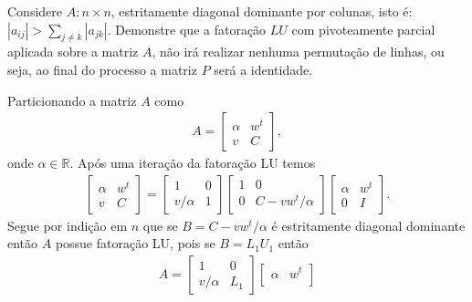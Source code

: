 \begin{questions}
     Considere $A : n \times n$, estritamente diagonal dominante por colunas, isto \'{e}: $| a_{ij} | > \sum_{j \neq k} | a_{jk} |$. Demonstre que a fatora\c{c}\~{a}o $LU$ com pivoteamente parcial aplicada sobre a matriz $A$, n\~{a}o ir\'{a} realizar nenhuma permuta\c{c}\~{a}o de linhas, ou seja, ao final do processo a matriz $P$ ser\'{a} a identidade.
    \begin{solution}
        Particionando a matriz $A$ como
        \begin{align*}
            A = \begin{bmatrix}
                \alpha & w^t \\
                v & C
            \end{bmatrix},
        \end{align*}
        onde $\alpha \in \mathbb{R}$. Ap\'{o}s uma itera\c{c}\~{a}o da fatora\c{c}\~{a}o LU temos
        \begin{align*}
            \begin{bmatrix}
                \alpha & w^t \\
                v & C
            \end{bmatrix} = \begin{bmatrix}
                1 & 0 \\
                v / \alpha & 1
            \end{bmatrix} \begin{bmatrix}
                1 & 0 \\
                0 & C - v w^t / \alpha
            \end{bmatrix} \begin{bmatrix}
                \alpha & w^t \\
                0 & I
            \end{bmatrix}.
        \end{align*}
        Segue por indi\c{c}\~{a}o em $n$ que se $B = C - v w^t / \alpha$ \'{e} estritamente diagonal dominante ent\~{a}o $A$ possue fatora\c{c}\~{a}o LU, pois se $B = L_1 U_1$ ent\~{a}o
        \begin{align*}
            A = \begin{bmatrix}
                1 & 0 \\
                v / \alpha & L_1
            \end{bmatrix} \begin{bmatrix}
                \alpha & w^t \\

\end{bmatrix}
\end{align*}
\end{solution}
\end{questions}
